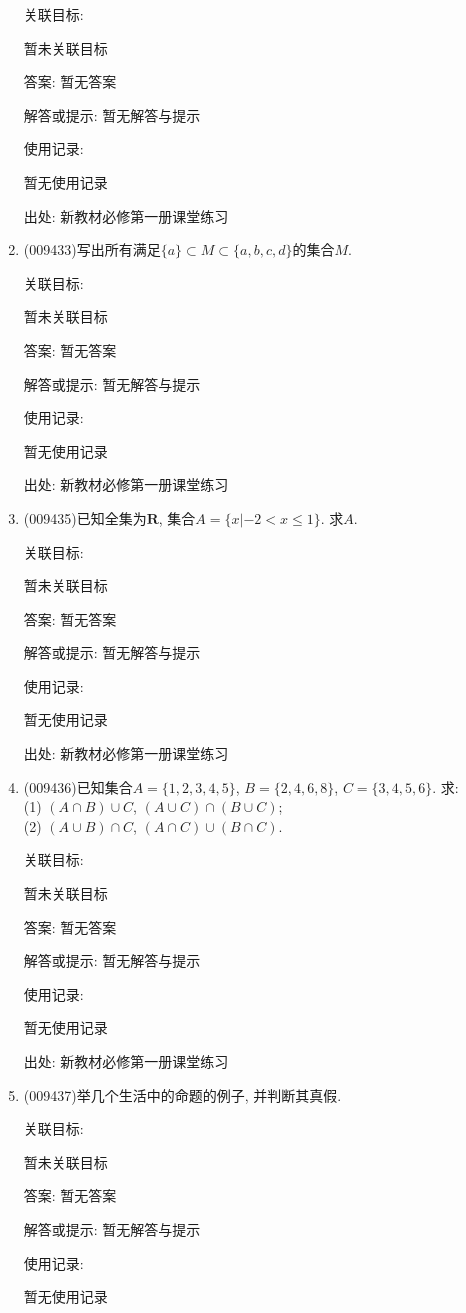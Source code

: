 \documentclass[10pt,a4paper]{article}
\begin{document}
\begin{enumerate}[1.]
关联目标:

暂未关联目标

答案: 暂无答案

解答或提示: 暂无解答与提示

使用记录:

暂无使用记录


出处: 新教材必修第一册课堂练习
\item { (009433)}写出所有满足$\{a\}\subset M\subset \{a, b, c, d\}$的集合$M$.


关联目标:

暂未关联目标

答案: 暂无答案

解答或提示: 暂无解答与提示

使用记录:

暂无使用记录


出处: 新教材必修第一册课堂练习
\item { (009435)}已知全集为$\mathbf{R}$, 集合$A=\{x|-2<x\le 1\}$. 求$A$.


关联目标:

暂未关联目标

答案: 暂无答案

解答或提示: 暂无解答与提示

使用记录:

暂无使用记录


出处: 新教材必修第一册课堂练习
\item { (009436)}已知集合$A=\{1, 2, 3, 4, 5\}$, $B=\{2, 4, 6, 8\}$, $C=\{3, 4, 5, 6\}$. 求:\\
(1) $(A\cap B)\cup C$, $(A\cup C)\cap (B\cup C)$;\\
(2) $(A\cup B)\cap C$, $(A\cap C)\cup (B\cap C)$.


关联目标:

暂未关联目标

答案: 暂无答案

解答或提示: 暂无解答与提示

使用记录:

暂无使用记录


出处: 新教材必修第一册课堂练习
\item { (009437)}举几个生活中的命题的例子, 并判断其真假.


关联目标:

暂未关联目标

答案: 暂无答案

解答或提示: 暂无解答与提示

使用记录:

暂无使用记录



\end{enumerate}
\end{document}
